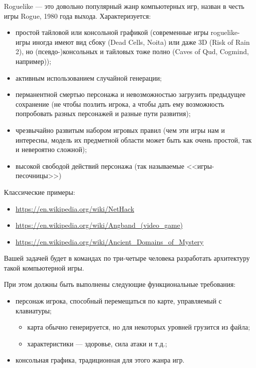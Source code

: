 \documentclass[a5paper]{homework}
\begin{document}

Roguelike --- это довольно популярный жанр компьютерных игр, назван в честь игры Rogue, 1980 года выхода. Характеризуется:

\begin{itemize}
    \item простой тайловой или консольной графикой (современные игры roguelike-игры иногда имеют вид сбоку (Dead Cells, Noita) или даже 3D (Risk of Rain 2), но (псевдо-)консольных и тайловых тоже полно (Caves of Qud, Cogmind, например));
    \item активным использованием случайной генерации;
    \item перманентной смертью персонажа и невозможностью загрузить предыдущее сохранение (не чтобы позлить игрока, а чтобы дать ему возможность попробовать разных персонажей и разные пути развития);
    \item чрезвычайно развитым набором игровых правил (чем эти игры нам и интересны, модель их предметной области может быть как очень простой, так и невероятно сложной);
    \item высокой свободой действий персонажа (так называемые <<игры-песочницы>>)
\end{itemize}

Классические примеры:
\begin{itemize}
    \item \url{https://en.wikipedia.org/wiki/NetHack}
    \item \url{https://en.wikipedia.org/wiki/Angband_(video_game)}
    \item \url{https://en.wikipedia.org/wiki/Ancient_Domains_of_Mystery}
\end{itemize}

Вашей задачей будет в командах по три-четыре человека разработать архитектуру такой компьютерной игры.

При этом должны быть выполнены следующие функциональные требования:

\begin{itemize}
    \item персонаж игрока, способный перемещаться по карте, управляемый с клавиатуры;
    \begin{itemize}
        \item карта обычно генерируется, но для некоторых уровней грузится из файла;
        \item характеристики --- здоровье, сила атаки и т.д.;
    \end{itemize}
    \item консольная графика, традиционная для этого жанра игр.
\end{itemize}
\end{document}
